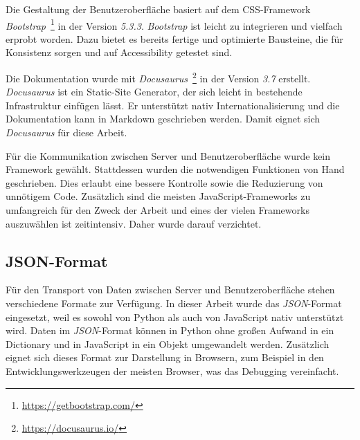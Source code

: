 Die Gestaltung der Benutzeroberfläche basiert auf dem CSS-Framework \textit{Bootstrap}~\footnote{\hspace{1.5mm}\url{https://getbootstrap.com/}} in der Version \textit{5.3.3}.
\textit{Bootstrap} ist leicht zu integrieren und vielfach erprobt worden. Dazu bietet es bereits fertige und optimierte Bausteine, die für Konsistenz sorgen und auf Accessibility getestet sind.


Die Dokumentation wurde mit \textit{Docusaurus}~\footnote{\hspace{1.5mm}\url{https://docusaurus.io/}} in der Version \textit{3.7} erstellt. \textit{Docusaurus} ist ein Static-Site Generator, der sich leicht in
bestehende Infrastruktur einfügen lässt. Er unterstützt nativ Internationalisierung und die Dokumentation kann in Markdown geschrieben werden. Damit eignet sich \textit{Docusaurus} für diese Arbeit.

Für die Kommunikation zwischen Server und Benutzeroberfläche wurde kein Framework gewählt. Stattdessen wurden die notwendigen Funktionen von Hand geschrieben. Dies erlaubt eine bessere Kontrolle sowie die
Reduzierung von unnötigem Code. Zusätzlich sind die meisten JavaScript-Frameworks zu umfangreich für den Zweck der Arbeit und eines der vielen Frameworks auszuwählen ist zeitintensiv. Daher wurde darauf verzichtet.

\subsection{JSON-Format}

Für den Transport von Daten zwischen Server und Benutzeroberfläche stehen verschiedene Formate zur Verfügung. In dieser Arbeit wurde das \textit{JSON}-Format eingesetzt,
weil es sowohl von Python als auch von JavaScript nativ unterstützt wird. Daten im \textit{JSON}-Format können in Python ohne großen Aufwand in ein Dictionary und in JavaScript in ein Objekt umgewandelt werden.
Zusätzlich eignet sich dieses Format zur Darstellung in Browsern, zum Beispiel in den Entwicklungswerkzeugen der meisten Browser, was das Debugging vereinfacht.

